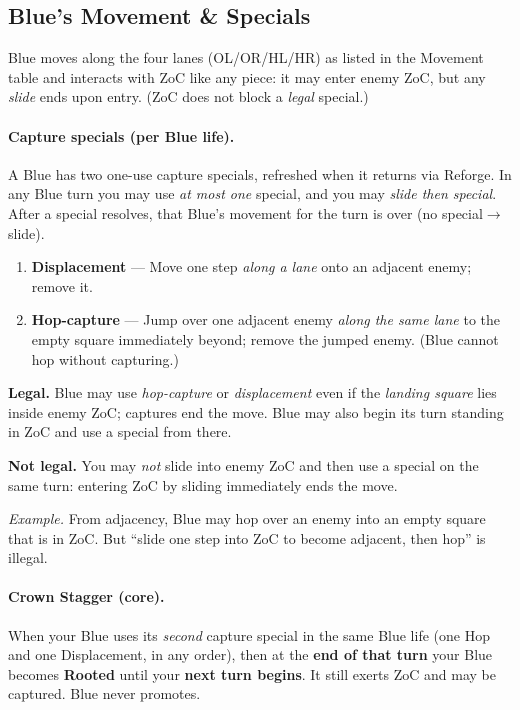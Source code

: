 \documentclass[11pt]{article}
\begin{document}
\subsection{Blue’s Movement \& Specials}\label{sec:blue}
Blue moves along the four lanes (OL/OR/HL/HR) as listed in the Movement table and interacts with ZoC like any piece: it may enter enemy ZoC, but any \emph{slide} ends upon entry. (ZoC does not block a \emph{legal} special.)

\paragraph{Capture specials (per Blue life).}
A Blue has two one-use capture specials, refreshed when it returns via Reforge. In any Blue turn you may use \emph{at most one} special, and you may \emph{slide then special}. After a special resolves, that Blue’s movement for the turn is over (no special$\rightarrow$slide).
\begin{enumerate}[label=(\alph*)]
  \item \textbf{Displacement} — Move one step \emph{along a lane} onto an adjacent enemy; remove it.
  \item \textbf{Hop-capture} — Jump over one adjacent enemy \emph{along the same lane} to the empty square immediately beyond; remove the jumped enemy. (Blue cannot hop without capturing.)
\end{enumerate}

\begin{tcolorbox}[enhanced,breakable,title={Rules Note — ZoC and Blue Specials}]
\small
\textbf{Legal.} Blue may use \emph{hop-capture} or \emph{displacement} even if the \emph{landing square} lies inside enemy ZoC; captures end the move. Blue may also begin its turn standing in ZoC and use a special from there.

\textbf{Not legal.} You may \emph{not} slide into enemy ZoC and then use a special on the same turn: entering ZoC by sliding immediately ends the move.

\textit{Example.} From adjacency, Blue may hop over an enemy into an empty square that is in ZoC. But “slide one step into ZoC to become adjacent, then hop” is illegal.
\end{tcolorbox}

\paragraph{Crown Stagger (core).}
When your Blue uses its \emph{second} capture special in the same Blue life (one Hop and one Displacement, in any order), then at the \textbf{end of that turn} your Blue becomes \textbf{Rooted} until your \textbf{next turn begins}. It still exerts ZoC and may be captured. Blue never promotes.
\end{document}
